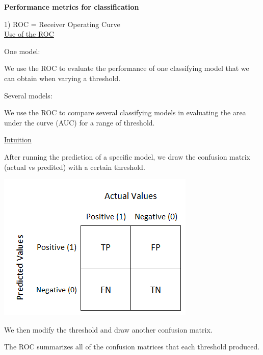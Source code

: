 {\fontsize{12pt}{22pt} \textbf{Performance metrics for classification}\par}

\vspace{5mm}

1) ROC = Receiver Operating Curve \\

\underline{Use of the ROC}

\vspace{5mm}

One model:

We use the ROC to evaluate the performance of one classifying model that we can obtain when varying a threshold.

\vspace{5mm}

Several models:

We use the ROC to compare several classifying models in evaluating the area under the curve (AUC) for a range of threshold.

\vspace{5mm}

\underline{Intuition}

\vspace{5mm}

After running the prediction of a specific model, we draw the confusion matrix (actual vs predited) with a certain threshold.

\includegraphics[scale=0.5]{confusionmatrice.png}

\vspace{5mm}

We then modify the threshold and draw another confusion matrix.

The ROC summarizes all of the confusion matrices that each threshold produced.

\vspace{5mm}

